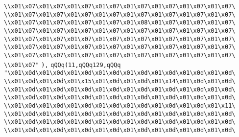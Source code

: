 \verb|\\x01\x07\x01\x07\x01\x07\x01\x07\x01\x07\x01\x07\x01\x07\x01\x07\|\newline
\verb|\\x01\x07\x01\x07\x01\x07\x01\x07\x01\x07\x01\x07\x01\x07\x01\x07\|\newline
\verb|\\x01\x07\x01\x07\x01\x07\x01\x07\x01\x08\x01\x07\x01\x07\x01\x07\|\newline
\verb|\\x01\x07\x01\x07\x01\x07\x01\x07\x01\x07\x01\x07\x01\x07\x01\x07\|\newline
\verb|\\x01\x07\x01\x07\x01\x07\x01\x07\x01\x07\x01\x07\x01\x07\x01\x07\|\newline
\verb|\\x01\x07\x01\x07\x01\x07\x01\x07\x01\x07\x01\x07\x01\x07\x01\x07\|\newline
\verb|\\x01\x07\x01\x07\x01\x07\x01\x07\x01\x07\x01\x07\x01\x07\x01\x07\|\newline
\verb|\\x01\x07"|\newline
\verb|),|\newline
\verb|qQQq(11,qQQq129,qQQq|\newline
\verb|"\x01\x0d\x01\x0d\x01\x0d\x01\x0d\x01\x0d\x01\x0d\x01\x0d\x01\x0d\|\newline
\verb|\\x01\x0d\x01\x0d\x01\x15\x01\x0d\x01\x0d\x01\x14\x01\x0d\x01\x0d\|\newline
\verb|\\x01\x0d\x01\x0d\x01\x0d\x01\x0d\x01\x0d\x01\x0d\x01\x0d\x01\x0d\|\newline
\verb|\\x01\x0d\x01\x0d\x01\x0d\x01\x0d\x01\x0d\x01\x0d\x01\x0d\x01\x0d\|\newline
\verb|\\x01\x0d\x01\x0d\x01\x0d\x01\x0d\x01\x0d\x01\x0d\x01\x0d\x01\x11\|\newline
\verb|\\x01\x0d\x01\x0d\x01\x0d\x01\x0d\x01\x0d\x01\x0d\x01\x0d\x01\x0d\|\newline
\verb|\\x01\x0d\x01\x0d\x01\x0d\x01\x0d\x01\x0d\x01\x0d\x01\x0d\x01\x0d\|\newline
\verb|\\x01\x0d\x01\x0d\x01\x0d\x01\x0d\x01\x0d\x01\x0d\x01\x0d\x01\x0d\|\newline
